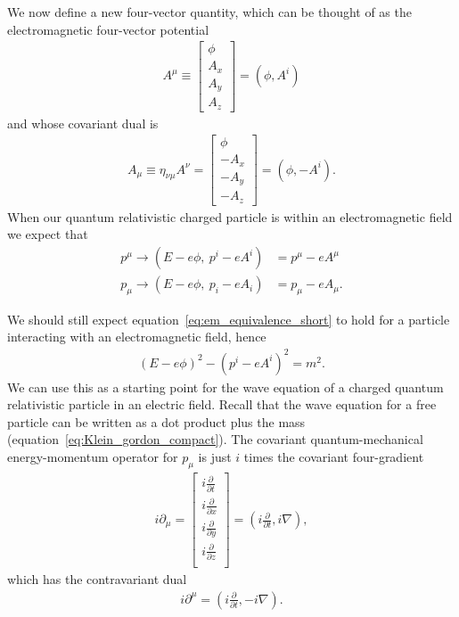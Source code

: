 \documentclass[titlepage,letterpaper,onecolumn,11pt,final]{report}
\numberwithin{equation}{section}
\numberwithin{figure}{section}
\begin{document}
We now define a new four-vector quantity, which can be thought of as the electromagnetic four-vector potential
\begin{gather}
	\label{A_contravariant}
	A^{\mu} \equiv 
	\begin{bmatrix}
		\phi \\[6pt]
		A_x \\[6pt]
		A_y \\[6pt]
		A_z 
	\end{bmatrix}
	= ( \phi, A^{i} )
\end{gather}
and whose covariant dual is
\begin{gather}
	\label{A_covariant}
	A_{\mu} \equiv \eta_{\nu \mu} A^{\nu} =
	\begin{bmatrix}
		\phi \\[6pt]
		-A_x \\[6pt]
		-A_y \\[6pt]
		-A_z
	\end{bmatrix}
	= ( \phi, - A^{i} ) .
\end{gather}
%
When our quantum relativistic charged particle is within an electromagnetic field we expect that
\begin{subequations}
\begin{align}
	\label{momentum_contravariant_em}
	p^{\mu} \rightarrow \left( E - e \phi,\ p^{i} - e A^{i} \right) &= p^{\mu} - e A^{\mu}\\
	\label{momentum_covariant_em}
	p_{\mu} \rightarrow \left( E - e \phi,\ p_{i} - e A_{i} \right) &= p_{\mu} - e A_{\mu} .
\end{align}
\end{subequations}

We should still expect equation~\ref{eq:em_equivalence_short} to hold for a particle interacting with an electromagnetic field, hence
\begin{gather}
	\left( E - e \phi \right)^{2} - \left( p^{i} - e A^{i} \right)^{2} = m^{2} .
\end{gather}
%
We can use this as a starting point for the wave equation of a charged quantum relativistic particle in an electric field. Recall that the wave equation for a free particle can be written as a dot product plus the mass (equation~\ref{eq:Klein_gordon_compact}). The covariant quantum-mechanical energy-momentum operator for $p_{\mu}$ is just $i$ times the covariant four-gradient
\begin{gather}
	i \partial_{\mu} =
	\begin{bmatrix}
		i \frac{\partial}{\partial t} \\[6pt]
		i \frac{\partial}{\partial x} \\[6pt]
		i \frac{\partial}{\partial y} \\[6pt]
		i \frac{\partial}{\partial z} \\[6pt]
	\end{bmatrix} =
	\left( i \frac{\partial}{\partial t} , i \nabla \right),
\end{gather}
which has the contravariant dual
\begin{gather}
	i \partial^{\mu} =
	\left( i \frac{\partial}{\partial t} , -i \nabla \right).
\end{gather}
\end{document}
